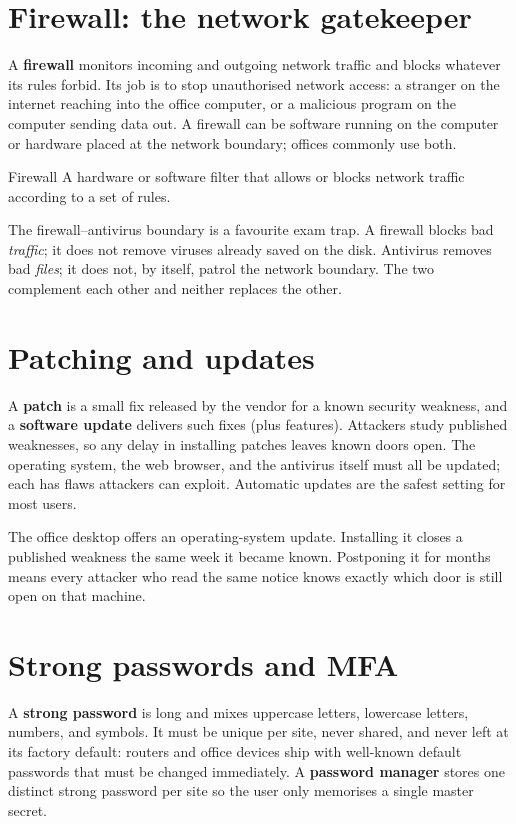 \section{Firewall: the network gatekeeper}
A \textbf{firewall} monitors incoming and outgoing network traffic and blocks
whatever its rules forbid. Its job is to stop unauthorised network access: a
stranger on the internet reaching into the office computer, or a malicious
program on the computer sending data out. A firewall can be software running
on the computer or hardware placed at the network boundary; offices commonly
use both.

\begin{definitionbox}{Firewall}
A hardware or software filter that allows or blocks network traffic
according to a set of rules.
\end{definitionbox}

The firewall--antivirus boundary is a favourite exam trap. A firewall blocks
bad \emph{traffic}; it does not remove viruses already saved on the disk.
Antivirus removes bad \emph{files}; it does not, by itself, patrol the network
boundary. The two complement each other and neither replaces the other.

\section{Patching and updates}
A \textbf{patch} is a small fix released by the vendor for a known security
weakness, and a \textbf{software update} delivers such fixes (plus features).
Attackers study published weaknesses, so any delay in installing patches
leaves known doors open. The operating system, the web browser, and the
antivirus itself must all be updated; each has flaws attackers can exploit.
Automatic updates are the safest setting for most users.

\begin{example}
The office desktop offers an operating-system update. Installing it closes a
published weakness the same week it became known. Postponing it for months
means every attacker who read the same notice knows exactly which door is
still open on that machine.
\end{example}

\section{Strong passwords and MFA}
A \textbf{strong password} is long and mixes uppercase letters, lowercase
letters, numbers, and symbols. It must be unique per site, never shared, and
never left at its factory default: routers and office devices ship with
well-known default passwords that must be changed immediately. A
\textbf{password manager} stores one distinct strong password per site so the
user only memorises a single master secret.

